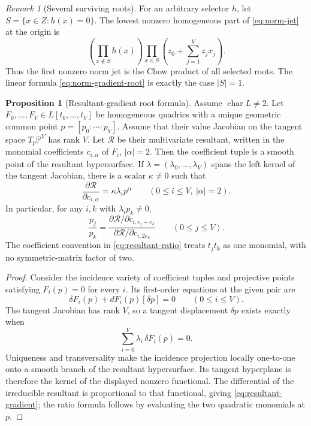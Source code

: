 \documentclass[11pt,a4paper]{article}
\theoremstyle{definition}
\newtheorem{proposition}[theorem]{Proposition}
\theoremstyle{remark}
\newtheorem{remark}[theorem]{Remark}
\newcommand{\PP}{\mathbb P}
\begin{document}
\begin{remark}[Several surviving roots]\label{rem:norm-multiple}
For an arbitrary selector $h$, let $S=\{x\in Z:h(x)=0\}$.  The lowest nonzero homogeneous part of \eqref{eq:norm-jet} at the origin is
\[
\left(\prod_{x\notin S}h(x)\right)
\prod_{x\in S}\left(z_0+\sum_{j=1}^Vz_jx_j\right).
\]
Thus the first nonzero norm jet is the Chow product of all selected roots.  The linear formula \eqref{eq:norm-gradient-root} is exactly the case $|S|=1$.
\end{remark}

\begin{proposition}[Resultant-gradient root formula]\label{prop:resultant-gradient}
Assume $\operatorname{char}L\ne2$.  Let $F_0,\ldots,F_V\in L[t_0,\ldots,t_V]$ be homogeneous quadrics with a unique geometric common point $p=[p_0:\cdots:p_V]$.  Assume that their value Jacobian on the tangent space $T_p\PP^V$ has rank $V$.  Let $\mathcal R$ be their multivariate resultant, written in the monomial coefficients $c_{i,\alpha}$ of $F_i$, $|\alpha|=2$.  Then the coefficient tuple is a smooth point of the resultant hypersurface.  If $\lambda=(\lambda_0,\ldots,\lambda_V)$ spans the left kernel of the tangent Jacobian, there is a scalar $\kappa\ne0$ such that
\begin{equation}\label{eq:resultant-gradient}
\frac{\partial\mathcal R}{\partial c_{i,\alpha}}
=\kappa\lambda_i p^\alpha
\qquad(0\le i\le V,\ |\alpha|=2).
\end{equation}
In particular, for any $i,k$ with $\lambda_i p_k\ne0$,
\begin{equation}\label{eq:resultant-ratio}
\frac{p_j}{p_k}
=
\frac{\partial\mathcal R/\partial c_{i,e_j+e_k}}
     {\partial\mathcal R/\partial c_{i,2e_k}}
\qquad(0\le j\le V).
\end{equation}
The coefficient convention in \eqref{eq:resultant-ratio} treats $t_jt_k$ as one monomial, with no symmetric-matrix factor of two.
\end{proposition}

\begin{proof}
Consider the incidence variety of coefficient tuples and projective points satisfying $F_i(p)=0$ for every $i$.  Its first-order equations at the given pair are
\[
\delta F_i(p)+dF_i(p)[\delta p]=0\qquad(0\le i\le V).
\]
The tangent Jacobian has rank $V$, so a tangent displacement $\delta p$ exists exactly when
\[
\sum_{i=0}^V\lambda_i\,\delta F_i(p)=0.
\]
Uniqueness and transversality make the incidence projection locally one-to-one onto a smooth branch of the resultant hypersurface.  Its tangent hyperplane is therefore the kernel of the displayed nonzero functional.  The differential of the irreducible resultant is proportional to that functional, giving \eqref{eq:resultant-gradient}; the ratio formula follows by evaluating the two quadratic monomials at $p$.
\end{proof}
\end{document}
